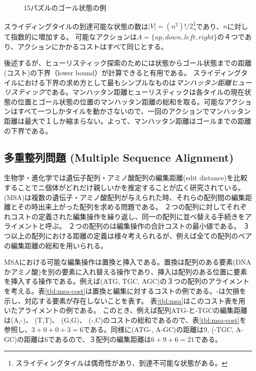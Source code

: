 \begin{figure}
\centering
\begin{tikzpicture}[scale=0.8]
  
\end{tikzpicture}
\caption{15パズルのゴール状態の例}
\label{fig:15-puzzle}
\end{figure}


スライディングタイルの到達可能な状態の数は$|V| = (n^2)!/2$\footnote{スライディングタイルは偶奇性があり、到達不可能な状態がある\cite{johnson1879notes}。}であり、$n$に対して指数的に増加する。
可能なアクションは$A= \{up, down, left, right\}$の４つであり、アクションにかかるコストはすべて同じとする。

後述するが、ヒューリスティック探索のためには状態からゴール状態までの距離(コスト)の下界（lower bound）が計算できると有用である。
スライディングタイルにおける下界の求め方として最もシンプルなものは{\it マンハッタン距離ヒューリスティック}である。マンハッタン距離ヒューリスティックは各タイルの現在状態の位置とゴール状態の位置のマンハッタン距離の総和を取る。可能なアクションはすべて一つしかタイルを動かさないので、一回のアクションでマンハッタン距離は最大で１しか縮まらない。よって、マンハッタン距離はゴールまでの距離の下界である。


\subsection{多重整列問題 (Multiple Sequence Alignment)}
\label{sec:msa}
生物学・進化学では遺伝子配列・アミノ酸配列の編集距離(edit distance)を比較することでニ個体がどれだけ親しいかを推定することが広く研究されている。
 (MSA)は複数の遺伝子・アミノ酸配列が与えられた時、それらの配列間の編集距離とその時出来上がった配列を求める問題である。
２つの配列に対してそれぞれコストの定義された編集操作を繰り返し、同一の配列に並べ替える手続きをアライメントと呼ぶ。
２つの配列のは編集操作の合計コストの最小値である。
３つ以上の配列における距離の定義は様々考えられるが、例えば全ての配列のペアの編集距離の総和を用いられる。

MSAにおける可能な編集操作は置換と挿入である。置換は配列のある要素(DNAかアミノ酸)を別の要素に入れ替える操作であり、挿入は配列のある位置に要素を挿入する操作である。例えば(ATG, TGC, AGC)の３つの配列のアライメントを考える。表\ref{tbl:msa-cost}は置換と編集に対するコストの例である。-は欠損を示し、対応する要素が存在しないことを表す。%
表\ref{tbl:msa}はこのコスト表を用いたアライメントの例である。
このとき、例えば配列ATG-と-TGCの編集距離は(A,-)、 (T,T)、 (G,G)、 (-,C)のコストの総和であるので、表\ref{tbl:msa-cost}を参照し、$3+0+0+3=6$である。同様に(ATG-, A-GC)の距離は$9$, (-TGC, A-GC)の距離は$6$であるので、３配列の編集距離は$6+9+6=21$である。

